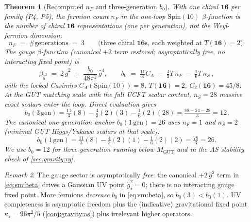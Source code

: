 \documentclass[11pt]{article}
\theoremstyle{plain}
\newtheorem{theorem}{Theorem}[section]
\theoremstyle{definition}
\theoremstyle{remark}
\newtheorem{remark}[theorem]{Remark}
\begin{document}
\begin{theorem}[Recomputed $n_F$ and three-generation $b_0$]\label{thm:sm:b0}
\label{thm:gravity:beta}
With one chiral $\mathbf{16}$ per family (P4, P5), the fermion count $n_F$ in the
one-loop $\mathrm{Spin}(10)$ $\beta$-function is the number of chiral
$\mathbf{16}$ \emph{representations} (one per generation), not the Weyl-fermion
dimension:
\begin{equation}\label{eq:sm:nF}
n_F \;=\; \#\text{generations} \;=\; 3
\qquad\text{(three chiral $\mathbf{16}$s, each weighted at $T(\mathbf{16})=2$).}
\end{equation}
The gauge $\beta$-function (canonical $+2$ term restored; asymptotically free, no
interacting fixed point) is
\begin{equation}\label{eq:sm:beta}
\beta_{\hat g^{2}} \;=\; 2\,\hat g^{2} \;+\; \frac{b_0}{48\pi^2}\,\hat g^{4},
\qquad
b_0 \;=\; \tfrac{11}{3}C_A \;-\; \tfrac{4}{3}T\,n_F \;-\; \tfrac{1}{6}T\,n_S\,,
\end{equation}
with the locked Casimirs $C_A(\mathrm{Spin}(10))=8$, $T(\mathbf{16})=2$,
$C_2(\mathbf{16})=45/8$. At the GUT matching scale with the full UCFT scalar
content, $n_S=28$ massive coset scalars enter the loop. Direct evaluation gives
\begin{equation}\label{eq:sm:b0three}
\boxed{\,
b_0(3\,\mathrm{gen})
=\tfrac{11}{3}(8)-\tfrac{4}{3}(2)(3)-\tfrac{1}{6}(2)(28)
=\tfrac{88-24-28}{3}=12\,.}
\end{equation}
The canonical one-generation anchor $b_0(1\,\mathrm{gen})=26$ uses $n_F=1$ and
$n_S=2$ (minimal GUT Higgs/Yukawa scalars at that scale):
\begin{equation}\label{eq:sm:b0one}
b_0(1\,\mathrm{gen})
=\tfrac{11}{3}(8)-\tfrac{4}{3}(2)(1)-\tfrac{1}{6}(2)(2)=\tfrac{78}{3}=26.
\end{equation}
We use $b_0=12$ for three-generation running below $M_{\mathrm{GUT}}$ and in the
AS stability check of \autoref{sec:gravity:rg}.
\end{theorem}

\begin{remark}
The gauge sector is asymptotically \emph{free}: the canonical $+2\,\hat g^{2}$
term in \eqref{eq:sm:beta} drives a Gaussian UV point $\hat g^{2}_\star=0$; there
is no interacting gauge fixed point. More fermions \emph{decrease} $b_0$ in
\eqref{eq:sm:beta}, so $b_0(3)<b_0(1)$. UV completeness is asymptotic freedom
plus the (indicative) gravitational fixed point $\kappa_\star=96\pi^2/5$
(\autoref{conj:gravity:as}) plus irrelevant higher operators.
\end{remark}
\end{document}
